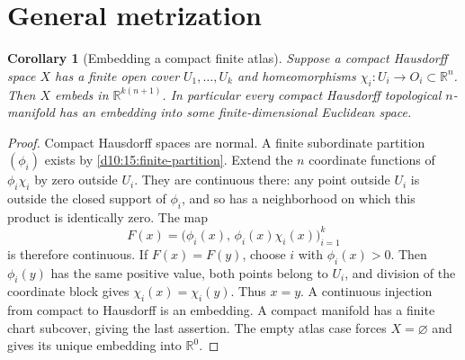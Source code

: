 \documentclass[11pt,oneside,openany]{book}
\newtheorem{corollary}[theorem]{Corollary}
\theoremstyle{definition}
\theoremstyle{remark}
\newcommand{\R}{\mathbb R}\newcommand{\C}{\mathbb C}
\begin{document}
\section{General metrization}
\begin{corollary}[Embedding a compact finite atlas]\label{d10:15:compact-atlas-embedding}
Suppose a compact Hausdorff space $X$ has a finite open cover
$U_1,\ldots,U_k$ and homeomorphisms $\chi_i:U_i\to O_i\subset\R^n$.
Then $X$ embeds in $\R^{k(n+1)}$. In particular every compact
Hausdorff topological $n$-manifold has an embedding into some
finite-dimensional Euclidean space.
\end{corollary}
\begin{proof}
Compact Hausdorff spaces are normal. A finite subordinate partition
$(\phi_i)$ exists by \cref{d10:15:finite-partition}. Extend the
$n$ coordinate functions of $\phi_i\chi_i$ by zero outside $U_i$.
They are continuous there: any point outside $U_i$ is outside
the closed support of $\phi_i$, and so has a neighborhood on
which this product is identically zero. The map
\[
 F(x)=\bigl(\phi_i(x),\,\phi_i(x)\chi_i(x)\bigr)_{i=1}^k
\]
is therefore continuous. If $F(x)=F(y)$, choose $i$ with
$\phi_i(x)>0$. Then $\phi_i(y)$ has the same positive value,
both points belong to $U_i$, and division of the coordinate
block gives $\chi_i(x)=\chi_i(y)$. Thus $x=y$.
A continuous injection from compact to Hausdorff is an embedding.
A compact manifold has a finite chart subcover, giving the last
assertion. The empty atlas case forces $X=\varnothing$ and gives
its unique embedding into $\R^0$.
\end{proof}
\end{document}
